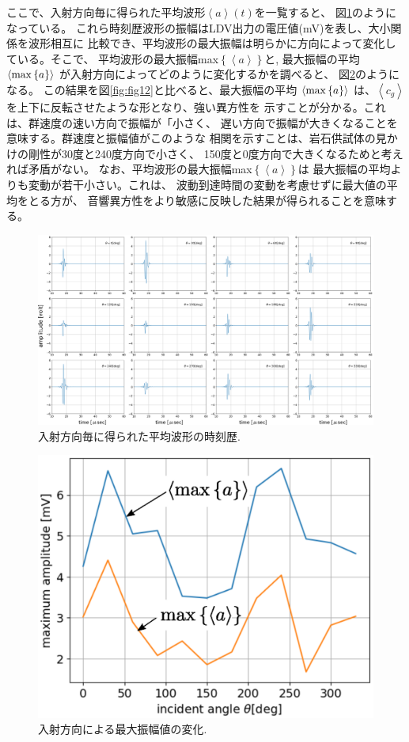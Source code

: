 ここで、入射方向毎に得られた平均波形$\left<a\right>(t)$を一覧すると、
図\ref{fig:fig11_1}のようになっている。
これら時刻歴波形の振幅はLDV出力の電圧値(mV)を表し、大小関係を波形相互に
比較でき、平均波形の最大振幅は明らかに方向によって変化している。そこで、
平均波形の最大振幅max$\left\{ \left< a \right>\right\}$と,
最大振幅の平均$\left< {\rm max}\left\{ a \right\} \right>$
が入射方向によってどのように変化するかを調べると、
図\ref{fig:fig14}のようになる。
この結果を図\ref{fig:fig12}と比べると、最大振幅の平均
$\left<{\rm max}\left\{a\right\}\right>$
は、$\left<c_g\right>$を上下に反転させたような形となり、強い異方性を
示すことが分かる。これは、群速度の速い方向で振幅が「小さく、
遅い方向で振幅が大きくなることを意味する。群速度と振幅値がこのような
相関を示すことは、岩石供試体の見かけの剛性が30度と240度方向で小さく、
150度と0度方向で大きくなるためと考えれば矛盾がない。
なお、平均波形の最大振幅max$\left\{\left<a\right>\right\}$は
最大振幅の平均よりも変動が若干小さい。これは、
波動到達時間の変動を考慮せずに最大値の平均をとる方が、
音響異方性をより敏感に反映した結果が得られることを意味する。
\begin{figure}[h]
	\begin{center}
	\includegraphics[width=1.0\linewidth]{Figs/fig11_1.eps} 
	\end{center}
	\caption{
		入射方向毎に得られた平均波形の時刻歴.
	} 
	\label{fig:fig11_1}
\end{figure}
\begin{figure}[h]
	\begin{center}
	\includegraphics[width=0.8\linewidth]{Figs/fig14.eps} 
	\end{center}
	\caption{
		入射方向による最大振幅値の変化.
	} 
	\label{fig:fig14}
\end{figure}

